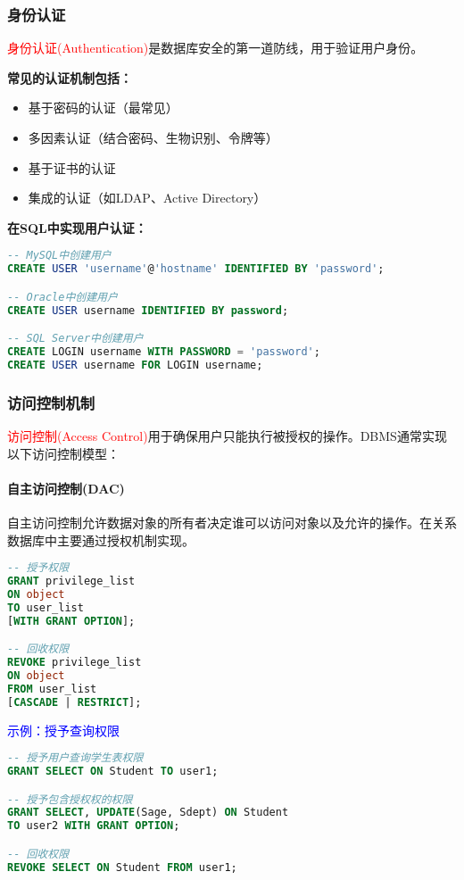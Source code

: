 \documentclass{../../note}
\begin{document}
\subsubsection{身份认证}
\textcolor{red}{身份认证(Authentication)}是数据库安全的第一道防线，用于验证用户身份。

\textbf{常见的认证机制包括：}
\begin{itemize}
    \item 基于密码的认证（最常见）
    \item 多因素认证（结合密码、生物识别、令牌等）
    \item 基于证书的认证
    \item 集成的认证（如LDAP、Active Directory）
\end{itemize}

\textbf{在SQL中实现用户认证：}
\begin{lstlisting}[language=SQL, caption=创建用户并设置密码]
-- MySQL中创建用户
CREATE USER 'username'@'hostname' IDENTIFIED BY 'password';

-- Oracle中创建用户
CREATE USER username IDENTIFIED BY password;

-- SQL Server中创建用户
CREATE LOGIN username WITH PASSWORD = 'password';
CREATE USER username FOR LOGIN username;
\end{lstlisting}

\subsubsection{访问控制机制}

\textcolor{red}{访问控制(Access Control)}用于确保用户只能执行被授权的操作。DBMS通常实现以下访问控制模型：

\paragraph{自主访问控制(DAC)}
自主访问控制允许数据对象的所有者决定谁可以访问对象以及允许的操作。在关系数据库中主要通过授权机制实现。

\begin{lstlisting}[language=SQL, caption=SQL中的权限授予与回收]
-- 授予权限
GRANT privilege_list
ON object
TO user_list
[WITH GRANT OPTION];

-- 回收权限
REVOKE privilege_list
ON object
FROM user_list
[CASCADE | RESTRICT];
\end{lstlisting}

\textcolor{blue}{示例：授予查询权限}
\begin{lstlisting}[language=SQL]
-- 授予用户查询学生表权限
GRANT SELECT ON Student TO user1;

-- 授予包含授权权的权限
GRANT SELECT, UPDATE(Sage, Sdept) ON Student
TO user2 WITH GRANT OPTION;

-- 回收权限
REVOKE SELECT ON Student FROM user1;
\end{lstlisting}
\end{document}
